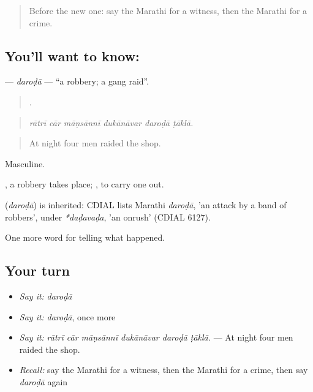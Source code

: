 \label{lesson:MR-C289-daroda}



\begin{quote}
Before the new one: say the Marathi for a witness, then the Marathi for a crime.
\end{quote}

\subsection*{You'll want to know: }
\textbf{} — \emph{daroḍā} — \textquotedblleft{}a robbery; a gang raid\textquotedblright{}.

\begin{quote}
     .
\end{quote}

\begin{quote}
\emph{rātrī cār māṇsānnī dukānāvar daroḍā ṭāklā.}
\end{quote}

\begin{quote}
At night four men raided the shop.
\end{quote}

Masculine.

 , a robbery takes place;  , to carry one out.

\begin{cousinweb}
\textbf{} (\emph{daroḍā}) is inherited: CDIAL lists Marathi \emph{daroḍā}, 'an attack by a band of robbers', under \emph{*daḍavaḍa}, 'an onrush' (CDIAL 6127).
\end{cousinweb}

\begin{grammarlens}[title={What you've built}]
One more word for telling what happened.
\end{grammarlens}

\subsection*{Your turn}
\begin{itemize}
\raggedright
  \item \emph{Say it:} \emph{daroḍā}
  \item \emph{Say it:} \emph{daroḍā}, once more
  \item \emph{Say it:} \emph{rātrī cār māṇsānnī dukānāvar daroḍā ṭāklā.} — At night four men raided the shop.
  \item \emph{Recall:} say the Marathi for a witness, then the Marathi for a crime, then say \emph{daroḍā} again
\end{itemize}

